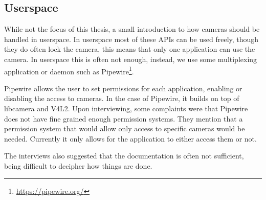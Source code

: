 \subsection{Userspace}\label{section:userspace}
While not the focus of this thesis, a small introduction to how cameras should
be handled in userspace. In userspace most of these APIs can be used freely,
though they do often lock the camera, this means that only one application can
use the camera. In userspace this is often not enough, instead, we use some
multiplexing application or daemon such as Pipewire\footnote{\url{https://pipewire.org/}}.

Pipewire allows the user to set permissions for each application, enabling or
disabling the access to cameras. In the case of Pipewire, it builds on top of
libcamera and V4L2. Upon interviewing, some complaints were that Pipewire does
not have fine grained enough permission systems. They mention that a permission
system that would allow only access to specific cameras would be needed.
Currently it only allows for the application to either access them or not.

The interviews also suggested that the documentation is often not sufficient,
being difficult to decipher how things are done.

